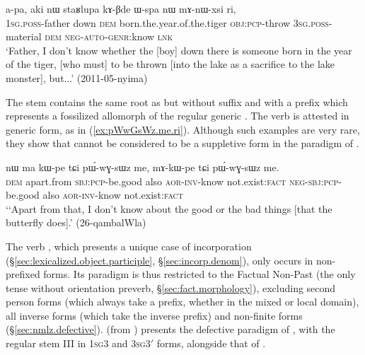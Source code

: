 \begin{exe}
\ex   \label{ex:mAnWxsi.ri}
 \gll a-pa, aki nɯ staʁlupa kɤ-βde ɯ-spa nɯ mɤ-nɯ-xsi ri, \\
 \textsc{1sg}.\textsc{poss}-father down \textsc{dem} born.the.year.of.the.tiger \textsc{obj}:\textsc{pcp}-throw \textsc{3sg}.\textsc{poss}-material \textsc{dem} \textsc{neg}-\textsc{auto}-\textsc{genr}:know \textsc{lnk} \\
 \glt `Father, I don't know whether the [boy] down there is someone born in the year of the tiger, [who must] to be thrown [into the lake as a sacrifice to the lake monster], but...' (2011-05-nyima)
\end{exe}

The stem  contains the same root as  but without  suffix and with a  prefix which represents a fossilized allomorph of the regular generic . The verb  is attested in generic form, as in (\ref{ex:pWwGsWz.me.ri}). Although such examples are very rare, they show that  cannot be considered to be a suppletive form in the paradigm of .
\largerpage
\begin{exe}
\ex   \label{ex:pWwGsWz.me.ri}
 \gll nɯ ma kɯ-pe tɕi pɯ́-wɣ-sɯz me, mɤ-kɯ-pe tɕi pɯ́-wɣ-sɯz me.  \\
 \textsc{dem} apart.from \textsc{sbj}:\textsc{pcp}-be.good also \textsc{aor}-\textsc{inv}-know not.exist:\textsc{fact} \textsc{neg}-\textsc{sbj}:\textsc{pcp}-be.good also \textsc{aor}-\textsc{inv}-know not.exist:\textsc{fact}  \\
`\glt `Apart from that, I don't know about the good or the bad things [that the butterfly does].' (26-qambalWla)
\end{exe}

The verb , which presents a unique case of incorporation (§\ref{sec:lexicalized.object.participle}, §\ref{sec:incorp.denom}), only occurs in non-prefixed forms. Its paradigm is thus restricted to the Factual Non-Past (the only tense without orientation preverb, §\ref{sec:fact.morphology}), excluding second person forms (which always take a prefix, whether in the mixed or local domain), all inverse forms (which take the  inverse prefix) and non-finite forms (§\ref{sec:nmlz.defective}).  (from \citealt{jacques12incorp}) presents the defective paradigm of , with the regular stem III  in \textsc{1sg}\fl{}3 and \textsc{3sg}\fl{}3$'$ forms, alongside that of .


